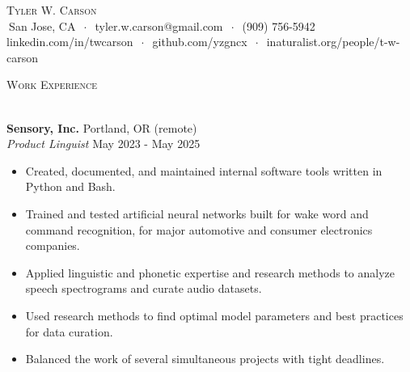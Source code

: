 \documentclass[]{article}
\newcommand{\lineunder} {
	\vspace*{-8pt} \\
	\hspace*{-18pt} \hrulefill \\
}
\newcommand{\header} [1] {
	{\hspace*{-18pt}\vspace*{6pt} \textsc{#1}}
	\vspace*{-6pt} \lineunder
}
\begin{document}
	\vspace*{-40pt}
	
	
	\vspace*{-10pt}
	\begin{center}
		{\Huge \scshape {Tyler W. Carson}}\\
		$\ $San Jose, CA $\ \cdot\ $ tyler.w.carson@gmail.com $\ \cdot\ $ (909) 756-5942\\ linkedin.com/in/twcarson $\ \cdot\ $ github.com/yzgncx $\ \cdot\ $ inaturalist.org/people/t-w-carson\\
	\end{center}
	
	
	\header{Work Experience}
	\vspace{1mm}

	\textbf{Sensory, Inc.} \hfill Portland, OR (remote)\\
	\textit{Product Linguist} \hfill May 2023 - May 2025\\
	\vspace{-3mm}
	\begin{itemize} \itemsep 0pt
		\item Created, documented, and maintained internal software tools written in Python and Bash.
		\item Trained and tested artificial neural networks built for wake word and command recognition, for major automotive and consumer electronics companies.
		\item Applied linguistic and phonetic expertise and research methods to analyze speech spectrograms and curate audio datasets.
		\item Used research methods to find optimal model parameters and best practices for data curation.
		\item Balanced the work of several simultaneous projects with tight deadlines.
	\end{itemize}
\end{document}
